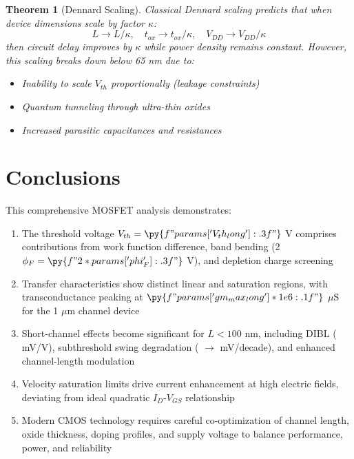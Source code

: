 \documentclass[a4paper, 11pt]{article}
\newtheorem{theorem}{Theorem}[section]
\begin{document}
\begin{theorem}[Dennard Scaling]
Classical Dennard scaling predicts that when device dimensions scale by factor $\kappa$:
\begin{equation}
L \to L/\kappa, \quad t_{ox} \to t_{ox}/\kappa, \quad V_{DD} \to V_{DD}/\kappa
\end{equation}
then circuit delay improves by $\kappa$ while power density remains constant. However, this scaling breaks down below 65 nm due to:
\begin{itemize}
\item Inability to scale $V_{th}$ proportionally (leakage constraints)
\item Quantum tunneling through ultra-thin oxides
\item Increased parasitic capacitances and resistances
\end{itemize}
\end{theorem}

\section{Conclusions}

This comprehensive MOSFET analysis demonstrates:

\begin{enumerate}
\item The threshold voltage $V_{th} = \py{f"{params['V_th_long']:.3f}"}$ V comprises contributions from work function difference, band bending (2$\phi_F = \py{f"{2*params['phi_F']:.3f}"}$ V), and depletion charge screening

\item Transfer characteristics show distinct linear and saturation regions, with transconductance peaking at $\py{f"{params['gm_max_long']*1e6:.1f}"}$ $\mu$S for the 1 $\mu$m channel device

\item Short-channel effects become significant for $L < 100$ nm, including DIBL ( mV/V), subthreshold swing degradation ( $\to$  mV/decade), and enhanced channel-length modulation

\item Velocity saturation limits drive current enhancement at high electric fields, deviating from ideal quadratic $I_D$-$V_{GS}$ relationship

\item Modern CMOS technology requires careful co-optimization of channel length, oxide thickness, doping profiles, and supply voltage to balance performance, power, and reliability
\end{enumerate}
\end{document}

